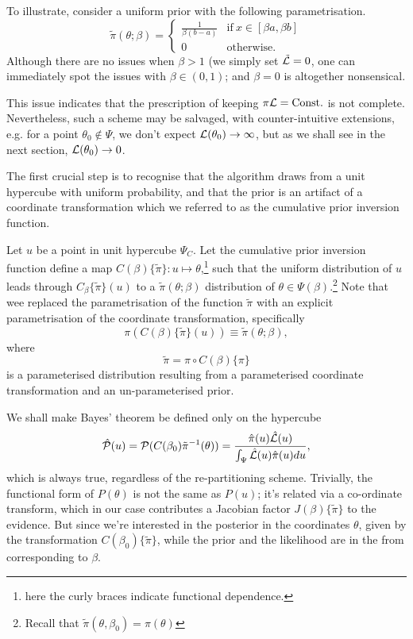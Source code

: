 \documentclass[usenatbib]{mnras}
\begin{document}
To illustrate, consider a uniform prior with the following
parametrisation.
\begin{equation}
  \tilde{\pi}(\theta; \beta) =
  \begin{cases}
	\frac{1}{\beta(b-a)} & \text{if}\ x \in [\beta a, \beta b] \\
	0 & \text{otherwise}.
  \end{cases}
\end{equation}
Although there are no issues when \(\beta>1\) (we simply set \({\cal
	\tilde{L}}=0\), one can immediately spot the issues with \(\beta \in (0,1)\);
and \(\beta=0\) is altogether nonsensical.

This issue indicates that the prescription of keeping \(\pi {\cal
	L} = \text{Const.}\) is not complete. Nevertheless, such a scheme
may be salvaged, with counter-intuitive extensions, e.g. for a
point \(\theta_{0} \notin \Psi\), we don't expect \({\cal
	L}(\theta_{0}) \rightarrow \infty\), but as we shall see in the
next section, \({\cal L}(\theta_{0}) \rightarrow 0\).

The first crucial step is to recognise that the algorithm draws
from a unit hypercube with uniform probability, and that the prior
is an artifact of a coordinate transformation which we referred to
as the cumulative prior inversion function.

Let \(u\) be a point in unit hypercube \(\Psi_{C}\). Let the cumulative
prior inversion function define a map \(C(\beta)\lbrace \tilde{\pi}\rbrace:u
	\mapsto \theta\),\footnote{here the curly braces indicate functional dependence.} such that the uniform distribution of \(u\) leads
through \(C_{\beta}\{\tilde{\pi}\}(u)\) to a \(\tilde{\pi}(\theta;\beta)\) distribution of \(\theta
	\in\Psi(\beta)\).\footnote{Recall that \(\tilde{\pi}(\theta, \beta_{0}) = \pi(\theta)\)} Note that wee
replaced the parametrisation of the function \(\tilde{\pi}\) with an
explicit parametrisation of the coordinate transformation, specifically
\begin{equation}
  \pi(C(\beta)\{\tilde{\pi}\}(u)) \equiv \tilde{\pi}(\theta; \beta),
\end{equation}
where 
\begin{equation}
  \tilde{\pi} =  \pi \circ C(\beta) \{ \pi \} 
\end{equation}
is a parameterised distribution resulting from a parameterised
coordinate transformation and an un-parameterised prior.

We shall make Bayes' theorem be defined only on the hypercube
\begin{equation}
{\cal \hat{P}}(u) = {\cal P}(C(\beta_{0}){\tilde{\pi}}^{-1}(\theta)) = \frac{\hat{\pi} (u) {\cal \hat{L}}(u)}{\int_{\Psi}{\cal \hat{L}}(u) \hat{\pi}(u) du},
\end{equation}
which is always true, regardless of the re-partitioning
scheme. Trivially, the functional form of \(P(\theta)\) is not the same
as \(P(u)\); it's related via a co-ordinate transform, which in our
case contributes a Jacobian factor \(J(\beta)\{\tilde{\pi}\}\) to the
evidence. But since we're interested in the posterior in the
coordinates \(\theta\), given by the transformation \(C(\beta_{0})\{\tilde{\pi}\}\),
while the prior and the likelihood are in the from corresponding
to \(\beta\).
\end{document}
